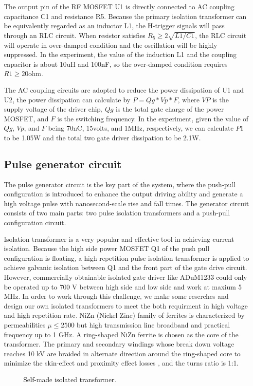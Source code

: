 \documentclass[aip,rsi,reprint,graphicx]{revtex4-1} %
\begin{document}
	The output pin of the RF MOSFET U1 is directly connected to AC coupling capacitance C1 and resistance R5. Because the primary isolation transformer can be equivalently regarded as an inductor L1, the H-trigger signals will pass through an RLC circuit. When resistor satisfies $R_5\ge 2\sqrt{L1/C1}$, the RLC circuit will operate in over-damped condition and the oscillation will be highly suppressed. In the experiment, the value of the induction L1 and the coupling capacitor is about 10uH and 100nF, so the over-damped condition requires $R1\ge20$ohm.

	The AC coupling circuits are adopted to reduce the power dissipation of U1 and U2, the power dissipation can calculate by $P= Qg*Vp*F$, where $VP$ is the supply voltage of the driver chip, $Qg$ is the total gate charge of the power MOSFET, and $F$ is the switching frequency. In the experiment, given the value of $Qg$, $Vp$, and $F$ being 70nC, 15volts, and  1MHz, respectively, we can calculate $P1$ to be 1.05W and the total two gate driver dissipation to be 2.1W.

\subsection{Pulse generator circuit}
The pulse generator circuit is the key part of the system, where the push-pull configuration is introduced to enhance the output driving ability and generate a high voltage pulse with nanosecond-scale rise and fall times. 
The generator circuit consists of two main parts: two pulse isolation transformers and a push-pull configuration circuit.

 Isolation transformer is a very popular and effective tool in achieving current isolation. 
 Because the high side power MOSFET Q1 of the push pull configuration is floating, a high repetition pulse isolation transformer is applied to achieve galvanic isolation between Q1 and the front part of the gate drive circuit. 
 However, commercially obtainable isolated gate driver like ADuM1233 could only be operated up to 700 V between high side and low side and work at maxium 5 MHz. In order to work through this challenge, we make some reserches and design our own isolated transformers to meet the both requirment in high voltage and high repetition rate.
 NiZn (Nickel Zinc) family of ferrites is characterized by permeabilities $\mu\le2500$ but high transmission line broadband and practical frequency up to 1 GHz\cite{TDKNiZn}.
 A ring-shaped NiZn ferrite is chosen as the core of the transformer.
 The primary and secondary windings whose break down voltage reaches 10 kV are braided in alternate direction around the ring-shaped core to minimize the skin-effect and proximity effect losses \cite{Dixon2001power}, and the turns ratio is 1:1.
\begin{figure}[hbt]
{}  
  \caption{Self-made isolated transformer.\label{FIG7}}
\end{figure}
\end{document}
